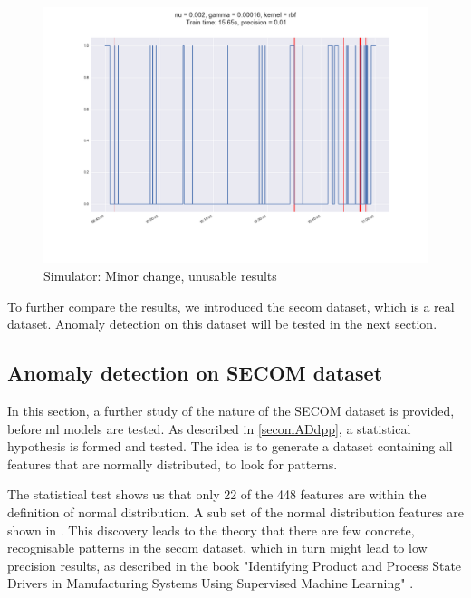 \documentclass[english, a4paper]{report}
\begin{document}
{{{            \begin{figure}[H]
                \centering
                \includegraphics[width=\textwidth, height=.42\textheight]{anom-simu-ok}
                \caption{Simulator: Minor change, unusable results}
                \label{fig:simuADnewNu}
            \end{figure}
            
            To further compare the results, we introduced the \gls{secom} dataset, which is a real dataset. Anomaly detection on this dataset will be tested in the next section.
        }
        
        \subsection{Anomaly detection on SECOM dataset}
        {
            In this section, a further study of the nature of the SECOM dataset is provided, before \gls{ml} models are tested. As described in \ref{secomADdpp}, a statistical hypothesis is formed and tested. The idea is to generate a dataset containing all features that are normally distributed, to look for patterns.
            \par
            The statistical test shows us that only 22 of the 448 features are within the definition of normal distribution. A sub set of the normal distribution features are shown in . This discovery leads to the theory that there are few concrete, recognisable patterns in the \gls{secom} dataset, which in turn might lead to low precision results, as described in the book "Identifying Product and Process State Drivers in Manufacturing Systems Using Supervised Machine Learning" \cite{supervisedMLsecom}.
            
}}}
\end{document}
